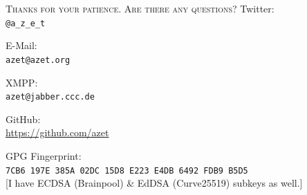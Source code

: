 \documentclass[hyperref={draft}]{beamer}
\begin{document}
\begin{frame}
  \begin{center}
    \textsc{Thanks for your patience. Are there any questions?}
    \vfill
    Twitter:\\
    \texttt{@a\_z\_e\_t}

    \vfill
    E-Mail:\\
    \texttt{azet@azet.org}

    \vfill
    XMPP:\\
    \texttt{azet@jabber.ccc.de}

    \vfill
    GitHub:\\
    \url{https://github.com/azet}

    \vfill
    GPG Fingerprint:\\
    \texttt{7CB6 197E 385A 02DC 15D8 E223 E4DB 6492 FDB9 B5D5}\\
    \scriptsize [I have ECDSA (Brainpool) \& EdDSA (Curve25519) subkeys as well.]
  \end{center}
\end{frame}

\end{document}

